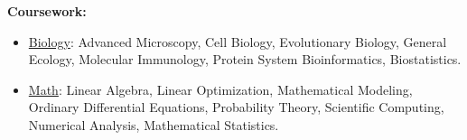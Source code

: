 \textbf{Coursework:}

\begin{itemize}[noitemsep]
\item \ul{Biology}: Advanced Microscopy, Cell Biology, Evolutionary Biology, General Ecology, Molecular Immunology, Protein System Bioinformatics, Biostatistics.
\item \ul{Math}: Linear Algebra, Linear Optimization, Mathematical Modeling, Ordinary Differential Equations, Probability Theory, Scientific Computing, Numerical Analysis, Mathematical Statistics.
\end{itemize}